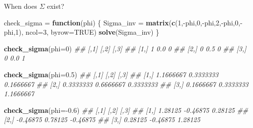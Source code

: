 \documentclass[11pt,ignorenonframetext,]{beamer}
\newenvironment{Shaded}{}{}
\newcommand{\CommentTok}[1]{\textcolor[rgb]{0.38,0.63,0.69}{\textit{#1}}}
\newcommand{\ControlFlowTok}[1]{\textcolor[rgb]{0.00,0.44,0.13}{\textbf{#1}}}
\newcommand{\DataTypeTok}[1]{\textcolor[rgb]{0.56,0.13,0.00}{#1}}
\newcommand{\DecValTok}[1]{\textcolor[rgb]{0.25,0.63,0.44}{#1}}
\newcommand{\FloatTok}[1]{\textcolor[rgb]{0.25,0.63,0.44}{#1}}
\newcommand{\KeywordTok}[1]{\textcolor[rgb]{0.00,0.44,0.13}{\textbf{#1}}}
\newcommand{\NormalTok}[1]{#1}
\newcommand{\OperatorTok}[1]{\textcolor[rgb]{0.40,0.40,0.40}{#1}}
\newcommand{\OtherTok}[1]{\textcolor[rgb]{0.00,0.44,0.13}{#1}}
\newcommand{\StringTok}[1]{\textcolor[rgb]{0.25,0.44,0.63}{#1}}
\let\oldShaded\Shaded
\let\endoldShaded\endShaded
\renewenvironment{Shaded}{\footnotesize\begin{spacing}{0.9}\oldShaded}{\endoldShaded\end{spacing}}
\begin{document}
\begin{frame}[fragile,t]{When does \(\Sigma\) exist?}
\protect\hypertarget{when-does-sigma-exist}{}

\begin{Shaded}
\begin{Highlighting}[]
\NormalTok{check_sigma =}\StringTok{ }\ControlFlowTok{function}\NormalTok{(phi) \{}
\NormalTok{  Sigma_inv =}\StringTok{ }\KeywordTok{matrix}\NormalTok{(}\KeywordTok{c}\NormalTok{(}\DecValTok{1}\NormalTok{,}\OperatorTok{-}\NormalTok{phi,}\DecValTok{0}\NormalTok{,}\OperatorTok{-}\NormalTok{phi,}\DecValTok{2}\NormalTok{,}\OperatorTok{-}\NormalTok{phi,}\DecValTok{0}\NormalTok{,}\OperatorTok{-}\NormalTok{phi,}\DecValTok{1}\NormalTok{), }\DataTypeTok{ncol=}\DecValTok{3}\NormalTok{, }\DataTypeTok{byrow=}\OtherTok{TRUE}\NormalTok{) }
  \KeywordTok{solve}\NormalTok{(Sigma_inv)}
\NormalTok{\}}

\KeywordTok{check_sigma}\NormalTok{(}\DataTypeTok{phi=}\DecValTok{0}\NormalTok{)}
\CommentTok{##      [,1] [,2] [,3]}
\CommentTok{## [1,]    1  0.0    0}
\CommentTok{## [2,]    0  0.5    0}
\CommentTok{## [3,]    0  0.0    1}

\KeywordTok{check_sigma}\NormalTok{(}\DataTypeTok{phi=}\FloatTok{0.5}\NormalTok{)}
\CommentTok{##           [,1]      [,2]      [,3]}
\CommentTok{## [1,] 1.1666667 0.3333333 0.1666667}
\CommentTok{## [2,] 0.3333333 0.6666667 0.3333333}
\CommentTok{## [3,] 0.1666667 0.3333333 1.1666667}

\KeywordTok{check_sigma}\NormalTok{(}\DataTypeTok{phi=}\OperatorTok{-}\FloatTok{0.6}\NormalTok{)}
\CommentTok{##          [,1]     [,2]     [,3]}
\CommentTok{## [1,]  1.28125 -0.46875  0.28125}
\CommentTok{## [2,] -0.46875  0.78125 -0.46875}
\CommentTok{## [3,]  0.28125 -0.46875  1.28125}
\end{Highlighting}
\end{Shaded}

\end{frame}
\end{document}
